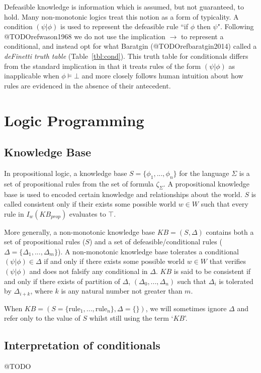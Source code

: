 Defeasible knowledge is information which is assumed, but not guaranteed, to hold. Many non-monotonic logics treat this notion as a form of typicality. A condition $(\psi|\phi)$ is used to represent the defeasible rule ``if $\phi$ then $\psi$". Following @TODOrefwason1968 we do not use the implication $\rightarrow$ to represent a conditional, and instead opt for what Baratgin (@TODOrefbaratgin2014) called a \textit{deFinetti truth table} (Table~\ref{tbl:cond}). This truth table for conditionals differs from the standard implication in that it treats rules of the form $(\psi|\phi)$ as inapplicable when $\phi \models \bot$ and more closely follows human intuition about how rules are evidenced in the absence of their antecedent.

\section{Logic Programming}
\subsection{Knowledge Base}
In propositional logic, a knowledge base $S=\{\phi_1,...,\phi_n\}$ for the language $\Sigma$ is a set of propositional rules from the set of formula $\zeta_\Sigma$. A propositional knowledge base is used to encoded certain knowledge and relationships about the world. $S$ is called consistent only if their exists some possible world $w \in W$ such that every rule in $I_w(KB_{prop})$ evaluates to $\top$.

More generally, a non-monotonic knowledge base $KB=(S, \Delta)$ contains both a set of propositional rules ($S$) and a set of defeasible/conditional rules ($\Delta=\{\Delta_1,...,\Delta_m\}$). A non-monotonic knowledge base tolerates a conditional $(\psi|\phi)\in\Delta$ if and only if there exists some possible world $w\in W$ that verifies $(\psi|\phi)$ and does not falsify any conditional in $\Delta$. $KB$ is said to be consistent if and only if there exists of partition of $\Delta$, $(\Delta_0,...,\Delta_n)$ such that $\Delta_i$ is tolerated by $\Delta_{i+k}$, where $k$ is any natural number not greater than $m$. 

When $KB=(S=\{\textrm{rule}_1,...,\textrm{rule}_n\},\Delta=\{\})$, we will sometimes ignore $\Delta$ and refer only to the value of $S$ whilst still using the term `$KB$'.
%
\subsection{Interpretation of conditionals}
@TODO



